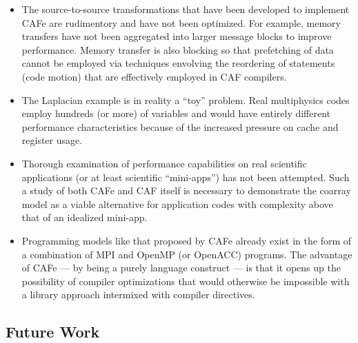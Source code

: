 \begin{itemize}
\item
  The source-to-source transformations that have been developed to implement CAFe
  are rudimentory and have not been optimized.  For example, memory transfers have
  not been aggregated into larger message blocks to improve performance.  Memory transfer
  is also blocking so that prefetching of data cannot be employed via techniques
  envolving the reordering of statements (code motion) that are effectively employed in
  CAF compilers.
\item
  The Laplacian example is in reality a ``toy'' problem.  Real multiphysics codes
  employ hundreds (or more) of variables and would have entirely different performance
  characteristics because of the increased pressure on cache and register usage.
\item
  Thorough examination of performance capabilities on real scientific applications
  (or at least scientific ``mini-apps'') has not been attempted.  Such a study of both
  CAFe and CAF itself is necessary to demonstrate the coarray model as a viable alternative
  for application codes with complexity above that of an idealized mini-app.
\item
  Programming models like that proposed by CAFe already exist in the form of a combination
  of MPI and OpenMP (or OpenACC) programs.  The advantage of CAFe --- by being a purely
  language construct --- is that it opens up the possibility of compiler optimizations
  that would otherwise be impossible with a library approach intermixed with compiler directives.
\end{itemize}

\subsection{Future Work}

